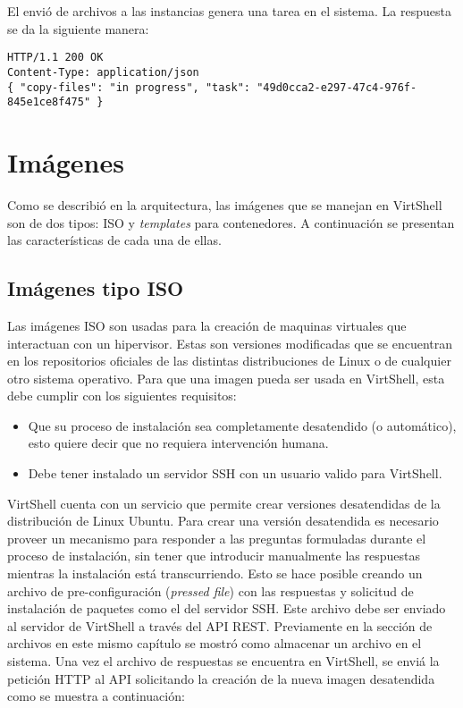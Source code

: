 \vspace{5mm}

El envió de archivos a las instancias genera una tarea en el sistema. La respuesta se da la siguiente manera:

\vspace{5mm}

\begin{lstlisting}[style=json, caption=Ejemplo de respuesta HTTP para el envio de archivos]
HTTP/1.1 200 OK
Content-Type: application/json
{ "copy-files": "in progress", "task": "49d0cca2-e297-47c4-976f-845e1ce8f475" }
\end{lstlisting}

\section{Imágenes}
Como se describió en la arquitectura, las imágenes que se manejan en VirtShell son de dos tipos: ISO y \emph{templates} para contenedores. A continuación se presentan las características de cada una de ellas.

\subsection{Imágenes tipo ISO}
Las imágenes ISO son usadas para la creación de maquinas virtuales que interactuan con un hipervisor. Estas son versiones modificadas que se encuentran en los repositorios oficiales de las distintas distribuciones de Linux o de cualquier otro sistema operativo. Para que una imagen pueda ser usada en VirtShell, esta debe cumplir con los siguientes requisitos: 
\begin{itemize}
\item Que su proceso de instalación sea completamente desatendido (o automático), esto quiere decir que no requiera intervención humana.
\item Debe tener instalado un servidor SSH con un usuario valido para VirtShell.
\end{itemize}

VirtShell cuenta con un servicio que permite crear versiones desatendidas de la distribución de Linux Ubuntu. Para crear una versión desatendida es necesario proveer un mecanismo para responder a las preguntas formuladas durante el proceso de instalación, sin tener que introducir manualmente las respuestas mientras la instalación está transcurriendo. Esto se hace posible creando un archivo de pre-configuración (\emph{pressed file}) con las respuestas y solicitud de instalación de paquetes como el del servidor SSH. Este archivo debe ser enviado al servidor de VirtShell a través del API REST. Previamente en la sección de archivos en este mismo capítulo se mostró como almacenar un archivo en el sistema. Una vez el archivo de respuestas se encuentra en VirtShell, se enviá la petición HTTP al API solicitando la creación de la nueva imagen desatendida como se muestra a continuación:

